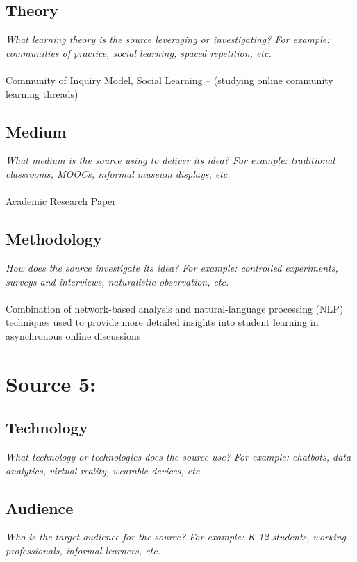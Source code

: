 \documentclass[12pt, final]{article}
\begin{document}
\subsection{Theory}
\textit{What learning theory is the source leveraging or investigating? For example: communities of practice, social learning, spaced repetition, etc.}
\\
\\
Community of Inquiry Model, Social Learning -- (studying online community learning threads)

\subsection{Medium}
\textit{What medium is the source using to deliver its idea? For example: traditional classrooms, MOOCs, informal museum displays, etc.}
\\
\\
Academic Research Paper

\subsection{Methodology}
\textit{How does the source investigate its idea? For example: controlled experiments, surveys and interviews, naturalistic observation, etc.}
\\
\\
Combination of network-based analysis and natural-language processing (NLP) techniques used to provide more detailed insights into student learning in asynchronous online discussions

\section{Source 5: }
\label{Source 5}

\subsection{Technology}
\textit{What technology or technologies does the source use? For example: chatbots, data analytics, virtual reality, wearable devices, etc.}

\subsection{Audience}
\textit{Who is the target audience for the source? For example: K-12 students, working professionals, informal learners, etc.}
\end{document}
